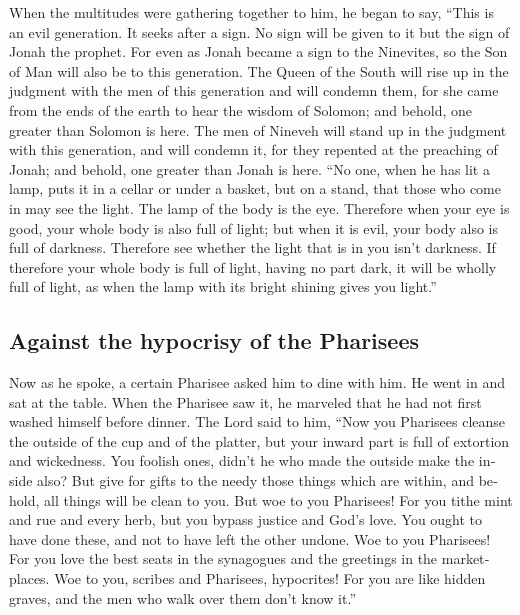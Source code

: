 \begin{paracol}{2}
\begin{otherlanguage}{english}
 When the multitudes were gathering together to him, he
began to say, ``This is an evil generation. It seeks after a sign. No
sign will be given to it but the sign of Jonah the prophet.
 For even as Jonah became a sign to the Ninevites, so the
Son of Man will also be to this generation.  The Queen of
the South will rise up in the judgment with the men of this generation
and will condemn them, for she came from the ends of the earth to hear
the wisdom of Solomon; and behold, one greater than Solomon is here.
 The men of Nineveh will stand up in the judgment with
this generation, and will condemn it, for they repented at the preaching
of Jonah; and behold, one greater than Jonah is here. 
``No one, when he has lit a lamp, puts it in a cellar or under a basket,
but on a stand, that those who come in may see the light.
 The lamp of the body is the eye. Therefore when your eye
is good, your whole body is also full of light; but when it is evil,
your body also is full of darkness.  Therefore see
whether the light that is in you isn't darkness.  If
therefore your whole body is full of light, having no part dark, it will
be wholly full of light, as when the lamp with its bright shining gives
you light.''

\hypertarget{against-the-hypocrisy-of-the-pharisees}{%
\subsection{Against the hypocrisy of the
Pharisees}\label{against-the-hypocrisy-of-the-pharisees}}

 Now as he spoke, a certain Pharisee asked him to dine
with him. He went in and sat at the table.  When the
Pharisee saw it, he marveled that he had not first washed himself before
dinner.  The Lord said to him, ``Now you Pharisees
cleanse the outside of the cup and of the platter, but your inward part
is full of extortion and wickedness.  You foolish ones,
didn't he who made the outside make the inside also?  But
give for gifts to the needy those things which are within, and behold,
all things will be clean to you.  But woe to you
Pharisees! For you tithe mint and rue and every herb, but you bypass
justice and God's love. You ought to have done these, and not to have
left the other undone.  Woe to you Pharisees! For you
love the best seats in the synagogues and the greetings in the
marketplaces.  Woe to you, scribes and Pharisees,
hypocrites! For you are like hidden graves, and the men who walk over
them don't know it.''


\end{otherlanguage}
\end{paracol}
